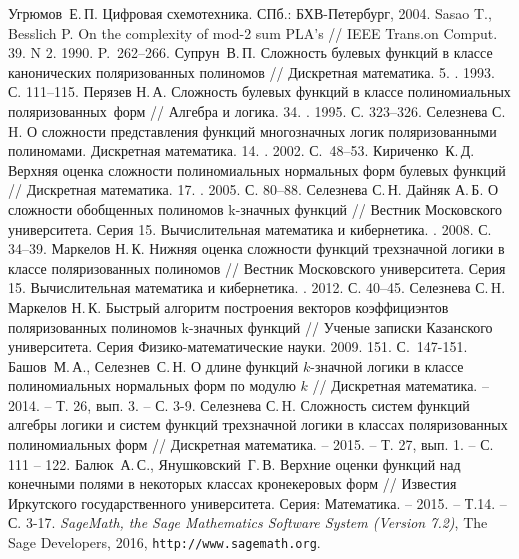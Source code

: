 \documentclass[bibliography=totoc, a4paper, 14pt]{extarticle}
\begin{document}
\makeatletter
\renewcommand*{\@biblabel}[1]{\hfill#1.}
\makeatother

\begin{singlespace}
\begin{thebibliography}{0}
 Угрюмов~Е.\,П. Цифровая схемотехника. СПб.: БХВ-Петербург, 2004.
 Sasao T., Besslich P. On the complexity of mod-2 sum PLA’s  // IEEE Trans.on Comput. 39. N 2. 1990. P.~262--266.
 Супрун~В.\,П. Сложность булевых функций в классе канонических поляризованных полиномов // Дискретная математика. 5.
    . 1993. С. 111--115.
 Перязев Н.\,А. Сложность булевых функций в классе полиномиальных поляризованных~форм // Алгебра и логика. 34.
    . 1995. С. 323--326.
 Селезнева С.\,H. О сложности представления функций многозначных логик поляризованными полиномами. Дискретная
    математика. 14. . 2002. С.~48--53.
 Кириченко~К.\,Д. Верхняя оценка сложности полиномиальных нормальных форм булевых функций
    // Дискретная математика. 17. . 2005. С. 80--88.
 Селезнева С.\,Н. Дайняк А.\,Б. О сложности обобщенных полиномов k\nobreakdash-значных функций // Вестник Московского
    университета. Серия 15. Вычислительная математика и кибернетика. . 2008. С. 34--39.
 Маркелов Н.\,К. Нижняя оценка сложности функций трехзначной логики в классе поляризованных полиномов // Вестник
    Московского университета. Серия 15. Вычислительная математика и кибернетика. . 2012. С. 40--45.
 Селезнева С.\,H. Маркелов Н.\,К. Быстрый алгоритм построения векторов коэффициэнтов поляризованных полиномов
    k-значных функций // Ученые записки Казанского университета. Серия Физико-математические науки. 2009. 151.
     С.~147-151.
 Башов~М.\,А., Селезнев~С.\,Н. О длине функций $k$-значной логики в классе полиномиальных нормальных
    форм по модулю $k$ // Дискретная математика. -- 2014. -- Т. 26, вып. 3. -- С. 3-9.
 Селезнева С.\,H. Сложность систем функций алгебры логики и систем функций трехзначной логики в классах
    поляризованных полиномиальных форм // Дискретная математика. -- 2015. -- Т. 27, вып. 1. -- С. 111 -- 122.
 Балюк~А.\,С., Янушковский~Г.\,В. Верхние оценки функций над конечными полями в некоторых классах
    кронекеровых форм // Известия Иркутского государственного университета. Серия: Математика. -- 2015. -- Т.14. -- С. 3-17.
\emph{{S}ageMath, the {S}age {M}athematics {S}oftware {S}ystem ({V}ersion
  7.2)}, The Sage Developers, 2016, {\tt http://www.sagemath.org}.
\end{thebibliography}

\end{singlespace}
\end{document}

